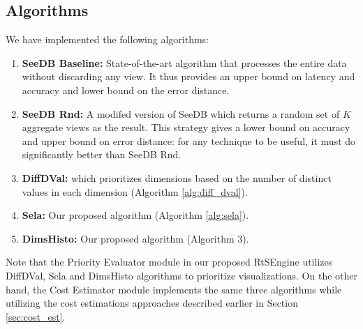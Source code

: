 \subsection{Algorithms}
%
We have implemented the following algorithms:
%
\begin{enumerate}
%
	\item \textbf{SeeDB Baseline:} State-of-the-art algorithm \cite{DBLP:journals/pvldb/VartakMPP14} that processes the entire data without discarding any view. It thus provides an upper bound on latency and accuracy and lower bound on the error distance.
\item \textbf{SeeDB Rnd:} A modifed version of SeeDB which returns a random set of $K$ aggregate views as the result. 
%
This strategy gives a lower bound on accuracy and upper bound on error distance: for any technique to be useful, it must do significantly better than SeeDB Rnd.
%
%
\item \textbf{DiffDVal: } which prioritizes dimensions based on the number of distinct values in each dimension (Algorithm \ref{alg:diff_dval}).
%
\item \textbf{Sela: } Our proposed algorithm (Algorithm \ref{alg:sela}).
%
\item \textbf{DimsHisto: } Our proposed algorithm (Algorithm 3).
%
%
\end{enumerate}
%
Note that the Priority Evaluator module in our proposed RtSEngine utilizes DiffDVal, Sela and DimsHisto algorithms to prioritize visualizations. 
%
On the other hand, the Cost Estimator module implements the same three algorithms while utilizing the cost estimations approaches described earlier in Section \ref{sec:cost_est}.
%
